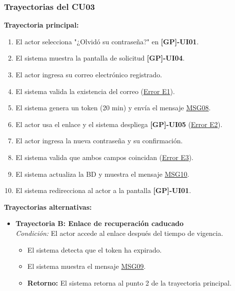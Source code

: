 \begin{appendices}
\subsubsection{Trayectorias del CU03}

\textbf{Trayectoria principal:}
\begin{enumerate}[nosep]
    \item El actor selecciona "¿Olvidó su contraseña?" en \textbf{[GP]-UI01}.
    \item El sistema muestra la pantalla de solicitud \textbf{[GP]-UI04}.
    \item El actor ingresa su correo electrónico registrado.
    \item El sistema valida la existencia del correo (\hyperlink{msg:MSG03}{Error E1}).
    \item El sistema genera un token (20 min) y envía el mensaje \hyperlink{msg:MSG08}{MSG08}.
    \item El actor usa el enlace y el sistema despliega \textbf{[GP]-UI05} (\hyperlink{err:E6}{Error E2}).
    \item El actor ingresa la nueva contraseña y su confirmación.
    \item El sistema valida que ambos campos coincidan (\hyperlink{err:E3}{Error E3}).
    \item El sistema actualiza la BD y muestra el mensaje \hyperlink{msg:MSG10}{MSG10}.
    \item El sistema redirecciona al actor a la pantalla \textbf{[GP]-UI01}.
\end{enumerate}

\textbf{Trayectorias alternativas:}
\begin{itemize}[leftmargin=*]
    \item \textbf{Trayectoria B: Enlace de recuperación caducado} \\
    \textit{Condición:} El actor accede al enlace después del tiempo de vigencia.
    \begin{itemize}[nosep]
        \item[B-1:] El sistema detecta que el token ha expirado.
        \item[B-2:] El sistema muestra el mensaje \hyperlink{msg:MSG09}{MSG09}.
        \item \textbf{Retorno:} El sistema retorna al punto 2 de la trayectoria principal.
    \end{itemize}
\end{itemize}


\end{appendices}
